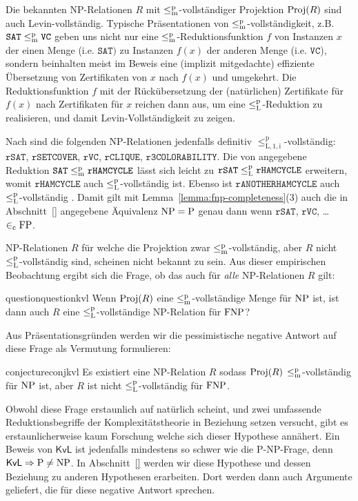 Die bekannten NP-Relationen $R$ mit $\leq_\mathrm{m}^\mathrm{p}$-vollständiger Projektion $\operatorname{Proj}(R)$ sind auch Levin-vollständig. Typische Präsentationen von $\leq_\mathrm{m}^\mathrm{p}$-vollständigkeit, z.B. $\mathtt{SAT}\leq_\mathrm{m}^\mathrm{p} \mathtt{VC}$ geben uns nicht nur eine $\leq_\mathrm{m}^\mathrm{p}$-Reduktionsfunktion $f$ von Instanzen $x$ der einen Menge (i.e. $\mathtt{SAT})$ zu Instanzen $f(x)$ der anderen Menge (i.e. $\mathtt{VC}$), sondern beinhalten meist im Beweis eine (implizit mitgedachte) effiziente Übersetzung von Zertifikaten von $x$ nach $f(x)$ und umgekehrt. Die Reduktionsfunktion $f$ mit der Rückübersetzung der (natürlichen) Zertifikate für $f(x)$ nach Zertifikaten für $x$ reichen dann aus, um eine $\leq_\mathrm{L}^\mathrm{p}$-Reduktion zu realisieren, und damit Levin-Vollständigkeit zu zeigen.

Nach \textcite[104]{goldreich_computational_2008} sind die folgenden NP-Relationen jedenfalls definitiv $\leq_\mathrm{L,1,i}^\mathrm p$-vollständig: $\mathtt{rSAT}$, $\mathtt{rSETCOVER}$, $\mathtt{rVC}$, $\mathtt{rCLIQUE}$, $\mathtt{r3COLORABILITY}$.
Die von \textcite[193-198]{papadimitriou_computational_1994} angegebene Reduktion $\mathtt{SAT}\leq_\mathrm{m}^\mathrm{p}\mathtt{rHAMCYCLE}$ lässt sich leicht zu $\mathtt{rSAT}\leq_\mathrm{L}^\mathrm{p}\mathtt{rHAMCYCLE}$ erweitern, womit $\mathtt{rHAMCYCLE}$ auch $\leq_\mathrm{L}^\mathrm{p}$-vollständig ist.
Ebenso ist $\mathtt{rANOTHERHAMCYCLE}$ auch $\leq_\mathrm{L}^\mathrm{p}$-vollständig \parencite*[232]{papadimitriou_computational_1994}. Damit gilt mit Lemma~\ref{lemma:fnp-completeness}(3) auch die in Abschnitt~\ref{} angegebene Äquivalenz $\mathrm{NP}=\mathrm{P}$ genau dann wenn $\mathtt{rSAT}$, $\mathtt{rVC}$, \dots $\in_\mathrm{c} \mathrm{FP}$.

NP-Relationen $R$ für welche die Projektion zwar $\leq_\mathrm{m}^\mathrm{p}$-vollständig, aber $R$ nicht $\leq_\mathrm{L}^\mathrm{p}$-vollständig sind, scheinen nicht bekannt zu sein.
Aus dieser empirischen Beobachtung ergibt sich die Frage, ob das auch für \emph{alle} NP-Relationen $R$ gilt: 
\begin{restatable}{question}{questionkvl}\label{question:kvl}
Wenn $\operatorname{Proj}(R)$ eine $\leq_\mathrm{m}^\mathrm{p}$-vollständige Menge für $\mathrm{NP}$ ist, ist dann auch $R$ eine $\leq_\mathrm{L}^\mathrm{p}$-vollständige NP-Relation für $\mathrm{FNP}$?
\end{restatable}
Aus Präsentationsgründen werden wir die pessimistische negative Antwort auf diese Frage als Vermutung formulieren:
\begin{restatable}{conjecture}{conjkvl}\label{conj:kvl}
    Es existiert eine NP-Relation $R$ sodass $\operatorname{Proj}(R)$ $\leq_\mathrm{m}^\mathrm{p}$-vollständig für $\mathrm{NP}$ ist, aber $R$ ist nicht $\leq_\mathrm{L}^\mathrm{p}$-vollständig für $\mathrm{FNP}$.
\end{restatable}
Obwohl diese Frage erstaunlich auf natürlich scheint, und zwei umfassende Reduktionsbegriffe der Komplexitätstheorie in Beziehung setzen versucht, gibt es erstaunlicherweise kaum Forschung welche sich dieser Hypothese annähert.
Ein Beweis von $\mathsf{KvL}$ ist jedenfalls mindestens so schwer wie die P-NP-Frage, denn $\mathsf{KvL}\Rightarrow \mathrm{P}\neq \mathrm{NP}$.
In Abschnitt~\ref{} werden wir diese Hypothese und dessen Beziehung zu anderen Hypothesen erarbeiten. Dort werden dann auch Argumente geliefert, die für diese negative Antwort sprechen.

